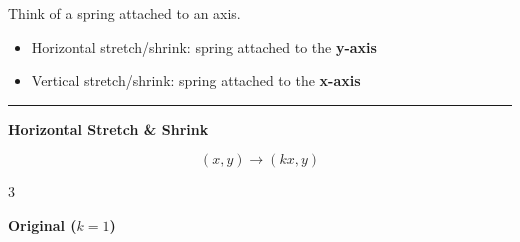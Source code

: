 \documentclass[11pt]{article}
\begin{document}
\vspace{0.5cm}


\begin{tcolorbox}[
colback=green!3,
colframe=green!50!black,
title=\Large B. Stretch / Shrink (The Spring Model)
]

Think of a spring attached to an axis.

\vspace{0.3cm}

\begin{itemize}

\item Horizontal stretch/shrink:
spring attached to the \textbf{y-axis}

\item Vertical stretch/shrink:
spring attached to the \textbf{x-axis}

\end{itemize}

\vspace{0.5cm}

\hrule

\vspace{0.5cm}


{\Large \textbf{Horizontal Stretch \& Shrink}}

\vspace{0.2cm}

\[
(x,y)\rightarrow(kx,y)
\]

\vspace{0.4cm}

\small

\begin{multicols}{3}


\begin{center}

\textbf{Original ($k=1$)}

\vspace{0.2cm}

\end{center}
\end{multicols}
\end{tcolorbox}
\end{document}
